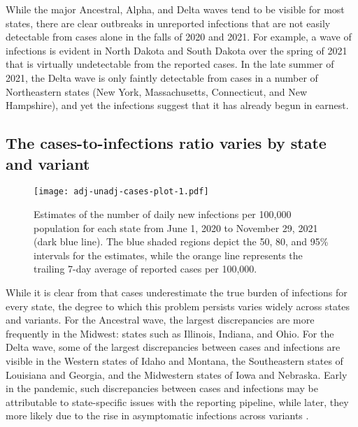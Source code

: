 While the major Ancestral, Alpha, and Delta waves tend to be visible for most
states, there are clear outbreaks in unreported infections that are not easily
detectable from cases alone in the falls of 2020 and 2021. For example, a wave
of infections is evident in North Dakota and South Dakota over the spring of
2021 that is virtually undetectable from the reported cases. In the late summer
of 2021, the Delta wave is only faintly detectable from cases in a number of
Northeastern states (New York, Massachusetts, Connecticut, and New Hampshire),
and yet the infections suggest that it has already begun in earnest. 

\subsection{The cases-to-infections ratio varies by state and variant}
\label{sec:case-infection-ratio}

\begin{figure}[!tb]
\centering
\texttt{[image: adj-unadj-cases-plot-1.pdf]} 
\caption{Estimates of the number of daily new infections per 100,000 population
for each \US state from June 1, 2020 to November 29, 2021 (dark blue line). The
blue shaded regions depict the 50, 80, and 95\% intervals for the estimates,
while the orange line represents the trailing 7-day average of reported cases
per 100,000.}
\label{fig:state_infect_est}
\end{figure}    

While it is clear from  that cases underestimate the
true burden of infections for every state, the degree to which this problem
persists varies widely across states and variants. For the Ancestral wave, the
largest discrepancies are more frequently in the Midwest: states such as
Illinois, Indiana, and Ohio. For the Delta wave, some of the largest
discrepancies between cases and infections are visible in the Western states of
Idaho and Montana, the Southeastern states of Louisiana and Georgia, and the
Midwestern states of Iowa and Nebraska. Early in the pandemic, such
discrepancies between cases and infections may be attributable to state-specific
issues with the reporting pipeline, while later, they more likely due to the
rise in asymptomatic infections across variants \citep{oph2022covid,
garrett2022high}. 

